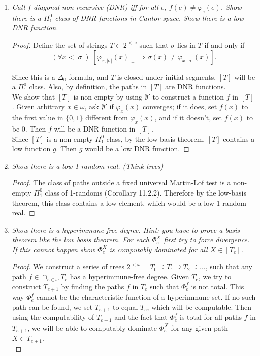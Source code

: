 \documentclass{article}
\begin{document}
\begin{enumerate}
  \item \it Call $f$ diagonal non-recursive (DNR) iff for all $e$,
    $f(e)\neq\varphi_e(e)$. Show there is a $\Pi_1^0$ class of DNR
    functions in Cantor space. Show there is a low DNR function.

    \begin{proof}
      Define the set of strings $T\subset2^{<\omega}$ such that $\sigma$
      lies in $T$ if and only if
      \[(\forall x<|\sigma|)\; [\varphi_{x,|\sigma|}(x)\downarrow
      \Rightarrow \sigma(x) \neq\varphi_{x,|\sigma|}(x)].\]

      Since this is a $\Delta_0$-formula, and $T$ is closed under initial
      segments, $[T]$ will be a $\Pi_1^0$ class. Also, by definition, the
      paths in $[T]$ are DNR functions. \\

      We show that $[T]$ is non-empty by using $\emptyset'$ to construct a
      function $f$ in $[T]$. Given arbitrary $x\in\omega$, ask $\emptyset'$
      if $\varphi_x(x)$ converges; if it does, set $f(x)$ to the first
      value in $\{0,1\}$ different from $\varphi_x(x)$, and if it
      doesn't, set $f(x)$ to be 0. Then $f$ will be a DNR function in
      $[T]$. \\

      Since $[T]$ is a non-empty $\Pi_1^0$ class, by the low-basis theorem,
      $[T]$ contains a low function $g$. Then $g$ would be a low DNR
      function.
    \end{proof}

  \item \it Show there is a low 1-random real. (Think trees)
    \begin{proof}
      The class of paths outside a fixed universal Martin-Lof test is a
      non-empty $\Pi_1^0$ class of 1-randoms (Corollary 11.2.2). Therefore
      by the low-basis theorem, this class contains a low element, which
      would be a low 1-random real.
    \end{proof}

  \item \it Show there is a hyperimmune-free degree. Hint: you have to
    prove a basis theorem like the low basis theorem. For each $\Phi^X_e$
    first try to force divergence. If this cannot happen show $\Phi_e^X$ is
    computably dominated for all $X\in[T_e]$.

    \begin{proof}
      We construct a series of trees $2^{<\omega}=T_0\supseteq T_1\supseteq
      T_2\supseteq\ldots$, such that any path $f\in\cap_{e\in\omega}T_e$
      has a hyperimmune-free degree. Given $T_e$, we try to construct
      $T_{e+1}$ by finding the paths $f$ in $T_e$ such that $\Phi^f_e$ is
      not total. This way $\Phi^f_e$ cannot be the characteristic function
      of a hyperimmune set. If no such path can be found, we set $T_{e+1}$
      to equal $T_e$, which will be computable. Then using the
      computability of $T_{e+1}$ and the fact that $\Phi^f_e$ is total for
      all paths $f$ in $T_{e+1}$, we will be able to computably dominate
      $\Phi^X_e$ for any given path $X\in T_{e+1}$.  \\


\end{proof}
\end{enumerate}
\end{document}
